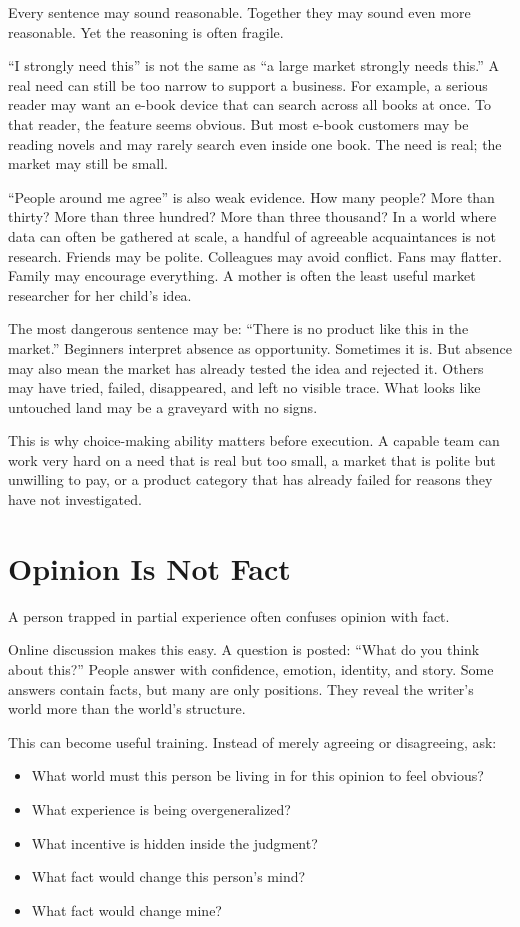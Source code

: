 Every sentence may sound reasonable. Together they may sound even more reasonable. Yet the reasoning is often fragile.

``I strongly need this'' is not the same as ``a large market strongly needs this.'' A real need can still be too narrow to support a business. For example, a serious reader may want an e-book device that can search across all books at once. To that reader, the feature seems obvious. But most e-book customers may be reading novels and may rarely search even inside one book. The need is real; the market may still be small.

``People around me agree'' is also weak evidence. How many people? More than thirty? More than three hundred? More than three thousand? In a world where data can often be gathered at scale, a handful of agreeable acquaintances is not research. Friends may be polite. Colleagues may avoid conflict. Fans may flatter. Family may encourage everything. A mother is often the least useful market researcher for her child's idea.

The most dangerous sentence may be: ``There is no product like this in the market.'' Beginners interpret absence as opportunity. Sometimes it is. But absence may also mean the market has already tested the idea and rejected it. Others may have tried, failed, disappeared, and left no visible trace. What looks like untouched land may be a graveyard with no signs.

This is why choice-making ability matters before execution. A capable team can work very hard on a need that is real but too small, a market that is polite but unwilling to pay, or a product category that has already failed for reasons they have not investigated.

\section*{Opinion Is Not Fact}

A person trapped in partial experience often confuses opinion with fact.

Online discussion makes this easy. A question is posted: ``What do you think about this?'' People answer with confidence, emotion, identity, and story. Some answers contain facts, but many are only positions. They reveal the writer's world more than the world's structure.

This can become useful training. Instead of merely agreeing or disagreeing, ask:

\begin{itemize}
\item What world must this person be living in for this opinion to feel obvious?
\item What experience is being overgeneralized?
\item What incentive is hidden inside the judgment?
\item What fact would change this person's mind?
\item What fact would change mine?
\end{itemize}

